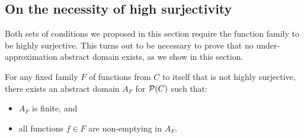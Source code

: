 \subsection{On the necessity of high surjectivity}\label{sec:uai:high-surjective}
Both sets of conditions we proposed in this section require the function family to be highly surjective. This turns out to be necessary to prove that no under-approximation abstract domain exists, as we show in this section.

\begin{prop}\label{prop:uai:existence-base}
	For any fixed family $F$ of functions from $C$ to itself that is not highly surjective, there exists an abstract domain $A_F$ for $\mathcal{P}(C)$ such that:
	\begin{itemize}
		\item $A_F$ is finite, and
		\item all functions $f \in F$ are non-emptying in $A_F$.
	\end{itemize}
\end{prop}

